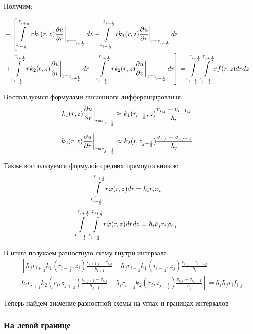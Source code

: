 Получим:

\begin{align*}
  &- \left [
   \int\limits^{z_{i+\frac{1}{2}}}_{z_{i-\frac{1}{2}}}  \left . r k_1(r, z) \pdv{u}{r} \right \vert_{r = r_{i + \frac{1}{2}}} dz
  - \int\limits^{z_{i+\frac{1}{2}}}_{z_{i-\frac{1}{2}}} \left . r k_1(r, z) \pdv{u}{r} \right \vert_{r = r_{i - \frac{1}{2}}} dz
  \right . \\
  &\left . + \int\limits^{r_{i+\frac{1}{2}}}_{r_{i-\frac{1}{2}}} \left . rk_2(r, z)\pdv{u}{v} \right \vert_{z = z_{j + \frac{1}{2}}} dr
  - \int\limits^{r_{i+\frac{1}{2}}}_{r_{i-\frac{1}{2}}} \left . rk_2(r, z)\pdv{u}{v} \right \vert_{z = z_{j - \frac{1}{2}}} dr
  \right ] = \int\limits^{r_{i +\frac{1}{2}}}_{r_{i -\frac{1}{2}}} \int\limits^{z_{j +\frac{1}{2}}}_{z_{j -\frac{1}{2}}} rf(r, z) dr dz
\end{align*}

Воспользуемся формулами численного дифференцирования:
\[
  \left . k_1(r, z) \pdv{u}{r} \right \vert_{r = r_{i - \frac{1}{2}}}
  \approx k_1(r_{i - \frac{1}{2}}, z) 
  \frac{v_{i, j} - v_{i - 1, j}}{h_i}
\]

\[
  \left . k_2(r, z) \pdv{u}{r} \right \vert_{z = z_{j - \frac{1}{2}}}
  \approx k_2(r, z_{j - \frac{1}{2}}) 
  \frac{v_{i, j} - v_{i, j - 1}}{h_j}
\]

Также воспользуемся формулой средних прямоугольников:
\[
  \int\limits^{r_{i+\frac{1}{2}}}_{r_{i-\frac{1}{2}}} r \varphi(r, z) dr
  = \hbar_i r_i \varphi_i
\]
\[
  \int\limits^{r_{i +\frac{1}{2}}}_{r_{i -\frac{1}{2}}} \int\limits^{z_{j +\frac{1}{2}}}_{z_{j -\frac{1}{2}}} r \varphi(r, z) drdz
  = \hbar_i\hbar_j r_i \varphi_{i, j}
\]

В итоге получаем разностную схему внутри интервала:
\begin{align*}
  &- \left [ 
  \hbar_j r_{i+\frac{1}{2}} k_1(r_{i+\frac{1}{2}}, z_j) \frac{v_{i+1, j} - v_{i, j}}{h_{i + 1}}
  - \hbar_j r_{i-\frac{1}{2}} k_1(r_{i-\frac{1}{2}}, z_j) \frac{v_{i, j} - v_{i - 1, j}}{h_{i}}
  \right . \\
  &\left .
  + \hbar_i r_{i+\frac{1}{2}} k_2(r_i, z_{j+\frac{1}{2}}) \frac{v_{i, j + 1} - v_{i, j}}{h_{j + 1}}
  - \hbar_i r_{i-\frac{1}{2}} k_2(r_i, z_{j-\frac{1}{2}}) \frac{v_{i, j} - v_{i, j - 1}}{h_j}
  \right ]  = \hbar_i \hbar_j r_i f_{i, j}
\end{align*}

Теперь найдем значение разностной схемы на углах и границах интервалов

\subsubsection{На левой границе}

